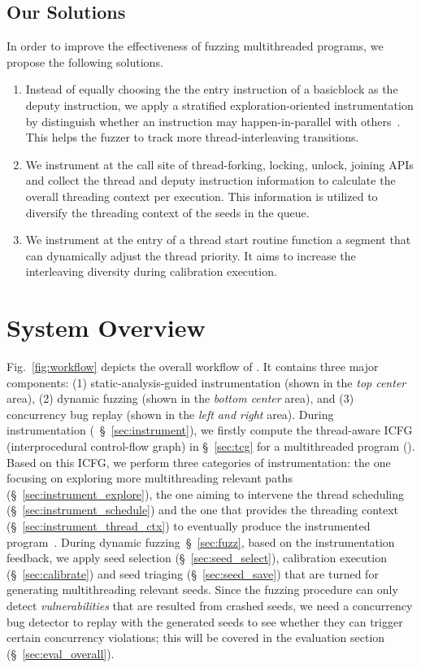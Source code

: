 \subsection{Our Solutions}
In order to improve the effectiveness of fuzzing multithreaded programs, we propose the following solutions.
\begin{enumerate}[{\bf S1}]
    \item Instead of equally choosing the the entry instruction of a basicblock as the deputy instruction, we apply a stratified exploration-oriented instrumentation by distinguish whether an instruction may happen-in-parallel with others~\cite{DBLP:conf/ppopp/DiS16,DBLP:conf/cgo/SuiDX16}.
This helps the fuzzer to track more thread-interleaving transitions.
    \item We instrument at the call site of thread-forking, locking, unlock, joining APIs and collect the thread and deputy instruction information to calculate the overall threading context per execution. This information is utilized to diversify the threading context of the seeds in the queue.
    \item We instrument at the entry of a thread start routine function a segment that can dynamically adjust the thread priority. It aims to increase the interleaving diversity during calibration execution.
\end{enumerate}






 \section{System Overview}

Fig.~\ref{fig:workflow} depicts the overall workflow of \mtfuzz. It contains three major components: (1) static-analysis-guided instrumentation (shown in the \emph{top center} area), (2) dynamic fuzzing (shown in the \emph{bottom center} area), and (3) concurrency bug replay (shown in the \emph{left and right} area). During instrumentation (~\S~\ref{sec:instrument}), we firstly compute the thread-aware ICFG (interprocedural control-flow graph) in \S~\ref{sec:tcg} for a multithreaded program (\ProgO). Based on this ICFG, we perform three categories of instrumentation: the one focusing on exploring more multithreading relevant paths (\S~\ref{sec:instrument_explore}), the one aiming to intervene the thread scheduling (\S~\ref{sec:instrument_schedule}) and the one that provides the threading context (\S~\ref{sec:instrument_thread_ctx}) to eventually produce the instrumented program~\Prog. During dynamic fuzzing~\S~\ref{sec:fuzz}, based on the instrumentation feedback, we apply seed selection (\S~\ref{sec:seed_select}), calibration execution (\S~\ref{sec:calibrate}) and seed triaging (\S~\ref{sec:seed_save}) that are turned for generating multithreading relevant seeds. Since the fuzzing procedure can only detect \emph{vulnerabilities} that are resulted from crashed seeds, we need a concurrency bug detector to replay with the generated seeds to see whether they can trigger certain concurrency violations; this will be covered in the evaluation section (\S~\ref{sec:eval_overall}).

